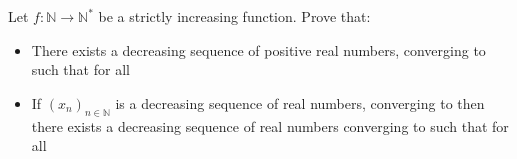 Let $f\colon\mathbb{N}\rightarrow\mathbb{N}^{\ast}$ be a strictly increasing function. Prove that:
\begin{itemize}
	\item There exists a decreasing sequence of positive real numbers,  converging to  such that  for all 
	\item If $(x_{n})_{n\in\mathbb{N}}$ is a decreasing sequence of real numbers, converging to  then there exists a decreasing sequence of real numbers  converging to  such that  for all 
\end{itemize}
